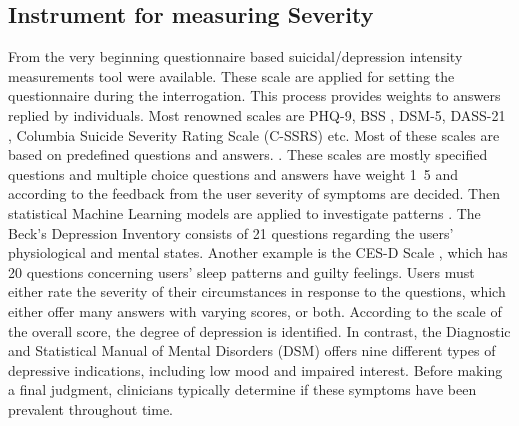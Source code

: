 \documentclass[sn-mathphys,Numbered]{sn-jnl}%
\theoremstyle{thmstyleone}%
\theoremstyle{thmstyletwo}%
\theoremstyle{thmstylethree}%
\begin{document}
\subsection{Instrument for measuring Severity}
From the very beginning questionnaire based suicidal/depression intensity measurements tool were available. These scale are applied for setting the questionnaire during the interrogation. This process provides weights to answers replied by individuals. Most renowned scales are PHQ-9, BSS \cite{beck2000weisman}, DSM-5, DASS-21 \cite{havigerova2019text}, Columbia Suicide Severity Rating Scale (C-SSRS) \cite{posner2011columbia, joiner1997modified} etc.  Most of these scales are based on predefined questions and answers. \cite{havigerova2019text, beck1961inventory, kroenke2001phq, tolentino2018dsm, kliem2017german, eke2010hamilton}. These scales are mostly specified questions and multiple choice questions and answers have weight 1~5 and according to the feedback from the user severity of symptoms are decided. Then statistical Machine Learning models are applied to investigate patterns \cite{shen2020detecting}. \cite{shen2017depression} The Beck's Depression Inventory \cite{beck2000weisman} consists of 21 questions regarding the users' physiological and mental states. Another example is the CES-D Scale \cite{radloff1977ces}, which has 20 questions concerning users' sleep patterns and guilty feelings. Users must either rate the severity of their circumstances in response to the questions, which either offer many answers with varying scores, or both. According to the scale of the overall score, the degree of depression is identified. In contrast, the Diagnostic and Statistical Manual of Mental Disorders (DSM) \cite{whooley2014diagnostic} offers nine different types of depressive indications, including low mood and impaired interest. Before making a final judgment, clinicians typically determine if these symptoms have been prevalent throughout time.  
\end{document}
